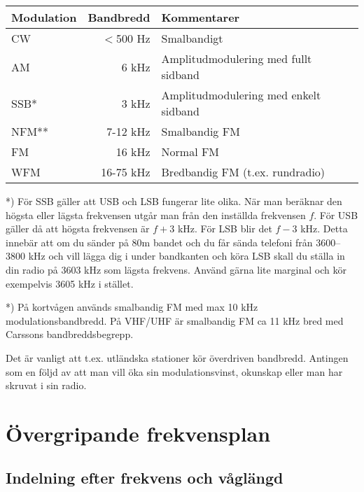 \begin{tabular}{lrl}
	\textbf{Modulation} & \textbf{Bandbredd} & \textbf{Kommentarer}                  \\ \hline
	CW                  &          $<$500 Hz & Smalbandigt                           \\
	AM                  &              6 kHz & Amplitudmodulering med fullt sidband  \\
	SSB*                &              3 kHz & Amplitudmodulering med enkelt sidband \\
	NFM**               &           7-12 kHz & Smalbandig FM                         \\
	FM                  &             16 kHz & Normal FM                             \\
	WFM                 &          16-75 kHz & Bredbandig FM (t.ex. rundradio)
\end{tabular}

*) För SSB gäller att USB och LSB fungerar lite olika. När man beräknar den högsta eller lägsta frekvensen utgår man från den inställda frekvensen $f$. För USB gäller då att högsta frekvensen är $f+3$ kHz. För LSB blir det $f-3$ kHz. Detta innebär att om du sänder på 80m bandet och du får sända telefoni från 3600--3800 kHz och vill lägga dig i under bandkanten och köra LSB skall du ställa in din radio på 3603 kHz som lägsta frekvens. Använd gärna lite marginal och kör exempelvis 3605 kHz i stället.

*) På kortvågen används smalbandig FM med max 10 kHz modulationsbandbredd. På VHF/UHF är smalbandig FM ca 11 kHz bred med Carssons bandbreddsbegrepp.

Det är vanligt att t.ex. utländska stationer kör överdriven bandbredd. Antingen som en följd av att man vill öka sin modulationsvinst, okunskap eller man har skruvat i sin radio.

\section{Övergripande frekvensplan}

\subsection{Indelning efter frekvens och våglängd}
\label{frekvens-vaglangd}

